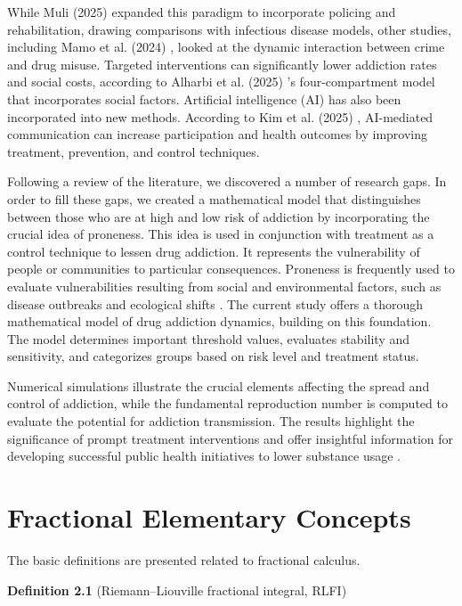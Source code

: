 \documentclass[10pt]{NSP1}
\begin{document}
While Muli (2025) \cite{ref19} expanded this paradigm to incorporate policing and rehabilitation, drawing comparisons with infectious disease models, other studies, including Mamo et al. (2024) \cite{ref18}, looked at the dynamic interaction between crime and drug misuse. Targeted interventions can significantly lower addiction rates and social costs, according to Alharbi et al. (2025) \cite{ref20}'s four-compartment model that incorporates social factors. Artificial intelligence (AI) has also been incorporated into new methods. According to Kim et al. (2025) \cite{ref21}, AI-mediated communication can increase participation and health outcomes by improving treatment, prevention, and control techniques.

Following a review of the literature, we discovered a number of research gaps. In order to fill these gaps, we created a mathematical model that distinguishes between those who are at high and low risk of addiction by incorporating the crucial idea of proneness. This idea is used in conjunction with treatment as a control technique to lessen drug addiction. It represents the vulnerability of people or communities to particular consequences. Proneness is frequently used to evaluate vulnerabilities resulting from social and environmental factors, such as disease outbreaks and ecological shifts \cite{ref20,ref21,ref22,ref23,ref24,ref25}. The current study offers a thorough mathematical model of drug addiction dynamics, building on this foundation. The model determines important threshold values, evaluates stability and sensitivity, and categorizes groups based on risk level and treatment status.

Numerical simulations illustrate the crucial elements affecting the spread and control of addiction, while the fundamental reproduction number is computed to evaluate the potential for addiction transmission. The results highlight the significance of prompt treatment interventions and offer insightful information for developing successful public health initiatives to lower substance usage \cite{ref15,ref16,ref17,ref18,ref19,ref20}.

\section{Fractional Elementary Concepts}

The basic definitions are presented related to fractional calculus.

\textbf{Definition 2.1} (Riemann–Liouville fractional integral, RLFI)  
\end{document}
